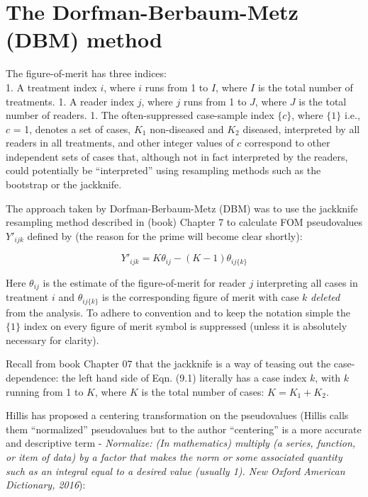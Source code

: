 \documentclass[
]{book}
\begin{document}
\hypertarget{the-dorfman-berbaum-metz-dbm-method}{%
\section{The Dorfman-Berbaum-Metz (DBM) method}\label{the-dorfman-berbaum-metz-dbm-method}}

The figure-of-merit has three indices:\\
1. A treatment index \(i\), where \(i\) runs from 1 to \(I\), where \(I\) is the total number of treatments.
1. A reader index \(j\), where \(j\) runs from 1 to \(J\), where \(J\) is the total number of readers.
1. The often-suppressed case-sample index \(\{c\}\), where \(\{1\}\) i.e., \(c\) = 1, denotes a set of cases, \(K_1\) non-diseased and \(K_2\) diseased, interpreted by all readers in all treatments, and other integer values of \(c\) correspond to other independent sets of cases that, although not in fact interpreted by the readers, could potentially be ``interpreted'' using resampling methods such as the bootstrap or the jackknife.

The approach \citep{RN204} taken by Dorfman-Berbaum-Metz (DBM) was to use the jackknife resampling method described in (book) Chapter 7 to calculate FOM pseudovalues \({Y'}_{ijk}\) defined by (the reason for the prime will become clear shortly):

\begin{equation}
Y'_{ijk}=K\theta_{ij}-(K-1)\theta_{ij\{k\}}
\label{eq:pValNotCentered}
\end{equation}

Here \(\theta_{ij}\) is the estimate of the figure-of-merit for reader \(j\) interpreting all cases in treatment \(i\) and \(\theta_{ij\{k\}}\) is the corresponding figure of merit with case \(k\) \emph{deleted} from the analysis. To adhere to convention and to keep the notation simple the \(\{1\}\) index on every figure of merit symbol is suppressed (unless it is absolutely necessary for clarity).

Recall from book Chapter 07 that the jackknife is a way of teasing out the case-dependence: the left hand side of Eqn. (9.1) literally has a case index \(k\), with \(k\) running from 1 to \(K\), where \(K\) is the total number of cases: \(K=K_1+K_2\).

Hillis has proposed a centering transformation on the pseudovalues (Hillis calls them ``normalized'' pseudovalues but to the author ``centering'' is a more accurate and descriptive term - \emph{Normalize: (In mathematics) multiply (a series, function, or item of data) by a factor that makes the norm or some associated quantity such as an integral equal to a desired value (usually 1). New Oxford American Dictionary, 2016}):
\end{document}
